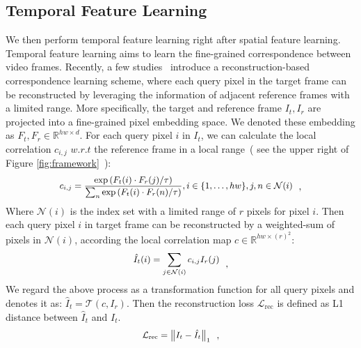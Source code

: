 \documentclass{article}
\begin{document}
\subsection{Temporal Feature Learning}
\label{temporal_feature_learning}
We then perform temporal feature learning right after spatial feature learning. Temporal feature learning aims to learn the fine-grained correspondence between video frames. Recently, a few studies~\cite{lai2020mast}\cite{vondrick2018tracking} introduce a reconstruction-based correspondence learning scheme, where each query pixel in the target frame can be reconstructed by leveraging the information of adjacent reference frames with a limited range. More specifically, the target and reference frame $I_{t}, I_r$ are projected into a  fine-grained pixel embedding space. We denoted these embedding as $F_t,F_{r} \in \mathbb{R}^{hw \times d}$. For each query pixel $i$ in $I_{t}$, we can calculate the local correlation $c_{i,j}$ $w.r.t$ the reference frame in a local range~( see the upper right of Figure \ref{fig:framework}~):
\begin{equation}\label{eq:local_correlation}
  \small
  \begin{aligned}
    c_{i, j}=\frac{\exp \left(F_t(i)  \cdot F_r(j) / \tau\right)}{\sum_{n} \exp \left(F_t(i) \cdot F_r(n) / \tau\right)}, i \in \{1,\ldots,hw\}, j,n \in \mathcal{N}(i)
  \end{aligned}~~,
\end{equation}
Where $\mathcal{N}(i)$ is the index set with a limited range of $r$ pixels for pixel $i$. Then each query pixel $i$ in target frame can be reconstructed by a weighted-sum of pixels in $\mathcal{N}(i)$, according the local correlation map $c \in \mathbb{R}^{hw \times (r)^2}$:
\begin{equation}\label{eq:reconstruction}
  \small
  \begin{aligned}
    \hat{I}_{t}(i)=\sum_{j \in \mathcal{N}(i)} c_{i,j} I_{r}(j)
  \end{aligned}~~,
\end{equation}
We regard the above process as a transformation function for all query pixels and denotes it as: $\hat{I}_{t} = \mathcal{T}\left(c, I_r\right)$. Then the reconstruction loss $\mathcal{L}_{\mathrm{rec}}$ is defined as L1 distance between $\hat{I}_{t}$ and $I_{t}$.
\begin{equation}\label{eq:reconstruction loss}
  \small
  \begin{aligned}
    \mathcal{L}_{\mathrm{rec}}=\left\|I_{t}-\hat{I}_{t}\right\|_{1}
  \end{aligned}~~,
\end{equation}
\end{document}
